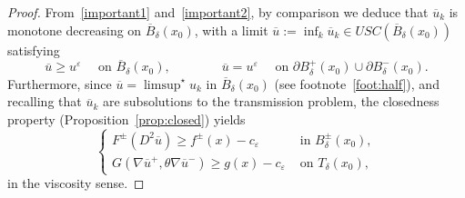 \documentclass[letter,11pt]{amsart}
\newcommand{\vep}{\varepsilon}
\newcommand{\uppers}{USC}
\theoremstyle{definition}
\numberwithin{equation}{section}
\begin{document}
\begin{proof}
\medskip

From~\eqref{important1} and~\eqref{important2}, by comparison we deduce that $\overline{u}_k$ is monotone decreasing on $\overline{B}_{\delta}(x_0)$, with a limit $\overline{u} := \inf_{k} \overline{u}_k \in \uppers(\overline{B}_{\delta}(x_0))$ satisfying
\begin{equation}
\label{limprop}
\overline{u} \geq u^{\vep} \quad \text{ on } \overline{B}_\delta(x_0),
\qquad
\qquad \overline{u} = u^{\vep} \quad \text{ on } \partial B_{\delta}^{+}(x_0) \cup \partial B_{\delta}^{-}(x_0).
\end{equation}
Furthermore, since $\overline{u} = \limsup^{\star} u_k$ in $\overline{B}_{\delta}(x_0)$ (see footnote~\ref{foot:half}), and recalling that $\overline{u}_k$ are subsolutions to the transmission problem, the closedness property (Proposition~\ref{prop:closed}) yields
\begin{equation}
\label{bvp1}
\begin{cases}
F^{\pm}(D^2 \overline{u}) \geq f^{\pm}(x) - c_{\vep} & \text{ in } B_{\delta}^{\pm}(x_0),\\
G(\nabla\overline{u}^{+}, \theta \nabla \overline{u}^{-}) \geq g(x) - c_{\vep} & \text{ on } T_{\delta}(x_0),
\end{cases}
\end{equation}
in the viscosity sense.

\medskip


\end{proof}
\end{document}
